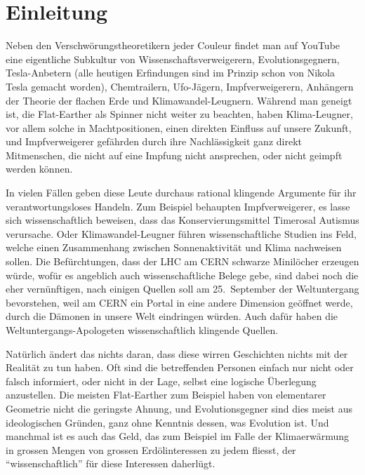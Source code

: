 %
%
%
\chapter*{Einleitung}
Neben den Verschwörungstheoretikern jeder Couleur findet man
auf YouTube eine eigentliche Subkultur von Wissenschaftsverweigerern,
Evolutionsgegnern, Tesla-Anbetern (alle heutigen Erfindungen sind im
Prinzip schon von Nikola Tesla gemacht worden), Chemtrailern, 
Ufo-Jägern,
Impfverweigerern, Anhängern der Theorie der flachen Erde
und Klimawandel-Leugnern.
Während man geneigt ist, die Flat-Earther als Spinner nicht weiter
zu beachten, haben Klima-Leugner, vor allem solche in Machtpositionen,
einen direkten Einfluss auf unsere Zukunft, und Impfverweigerer
gefährden durch ihre Nachlässigkeit ganz direkt Mitmenschen, die
nicht auf eine Impfung nicht ansprechen, oder nicht geimpft werden
können.

In vielen Fällen geben diese Leute durchaus rational klingende
Argumente für ihr verantwortungsloses Handeln.
Zum Beispiel behaupten Impfverweigerer, es lasse sich wissenschaftlich
beweisen, dass das Konservierungsmittel Timerosal Autismus verursache.
Oder Klimawandel-Leugner führen wissenschaftliche Studien ins Feld,
welche einen Zusammenhang zwischen Sonnenaktivität und Klima 
nachweisen sollen.
Die Befürchtungen, dass der LHC am CERN schwarze Minilöcher erzeugen
würde, wofür es angeblich auch wissenschaftliche Belege gebe,
sind dabei noch die eher vernünftigen, nach einigen Quellen soll
am 25.~September der Weltuntergang bevorstehen, weil am CERN ein
Portal in eine andere Dimension geöffnet werde, durch die Dämonen
in unsere Welt eindringen würden.
Auch dafür haben die Weltuntergangs-Apologeten wissenschaftlich
klingende Quellen.

Natürlich ändert das nichts daran, dass diese wirren Geschichten
nichts mit der Realität zu tun haben.
Oft sind die betreffenden Personen einfach nur nicht oder falsch
informiert, oder nicht in der Lage, selbst eine logische Überlegung
anzustellen.
Die meisten Flat-Earther zum Beispiel haben von elementarer Geometrie
nicht die geringste Ahnung, und Evolutionsgegner sind dies meist aus
ideologischen Gründen, ganz ohne Kenntnis dessen, was Evolution ist.
Und manchmal ist es auch das Geld, das zum Beispiel im Falle der 
Klimaerwärmung in grossen Mengen von grossen Erdölinteressen zu
jedem fliesst, der ``wissenschaftlich'' für diese Interessen
daherlügt.

